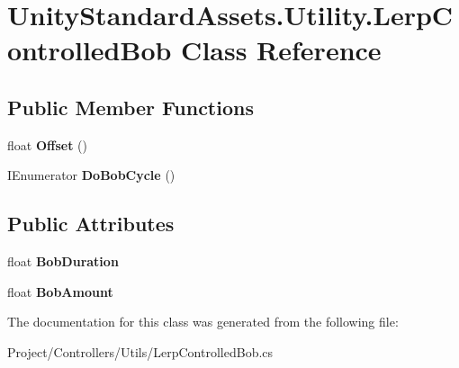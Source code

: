\hypertarget{class_unity_standard_assets_1_1_utility_1_1_lerp_controlled_bob}{}\section{Unity\+Standard\+Assets.\+Utility.\+Lerp\+Controlled\+Bob Class Reference}
\label{class_unity_standard_assets_1_1_utility_1_1_lerp_controlled_bob}
\subsection*{Public Member Functions}
\begin{DoxyCompactItemize}
\item 
\mbox{\label{class_unity_standard_assets_1_1_utility_1_1_lerp_controlled_bob_a6260e516b19ee9440bb22c160d0cbed9}} 
float {\bfseries Offset} ()
\item 
\mbox{\label{class_unity_standard_assets_1_1_utility_1_1_lerp_controlled_bob_a22a2016a4d643696d81fc5e5d0809832}} 
I\+Enumerator {\bfseries Do\+Bob\+Cycle} ()
\end{DoxyCompactItemize}
\subsection*{Public Attributes}
\begin{DoxyCompactItemize}
\item 
\mbox{\label{class_unity_standard_assets_1_1_utility_1_1_lerp_controlled_bob_a7b2e1bb225e6350e7e95617457c2c0e9}} 
float {\bfseries Bob\+Duration}
\item 
\mbox{\label{class_unity_standard_assets_1_1_utility_1_1_lerp_controlled_bob_a877cd224920e669aee363f5acc38c711}} 
float {\bfseries Bob\+Amount}
\end{DoxyCompactItemize}


The documentation for this class was generated from the following file\+:\begin{DoxyCompactItemize}
\item 
Project/\+Controllers/\+Utils/Lerp\+Controlled\+Bob.\+cs\end{DoxyCompactItemize}

